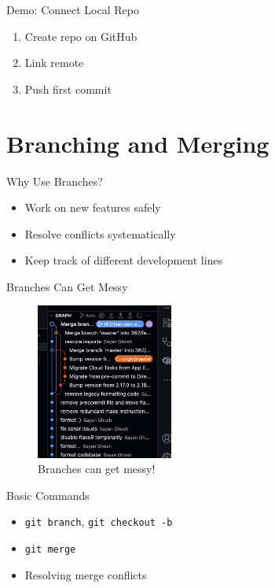 \documentclass[aspectratio=169]{beamer} %
\begin{document}
\begin{frame}{Demo: Connect Local Repo}
  \begin{enumerate}
    \item Create repo on GitHub
    \item Link remote
    \item Push first commit
  \end{enumerate}
\end{frame}

\section{Branching and Merging}

\begin{frame}{Why Use Branches?}
  \begin{itemize}
    \item Work on new features safely
    \item Resolve conflicts systematically
    \item Keep track of different development lines
  \end{itemize}
\end{frame}

\begin{frame}{Branches Can Get Messy}
\begin{figure}
  \centering
  \includegraphics[width=0.4\textwidth]{res/branches.png}
  \caption{Branches can get messy!}
\end{figure}
\end{frame}

\begin{frame}{Basic Commands}
  \begin{itemize}
    \item \texttt{git branch}, \texttt{git checkout -b}
    \item \texttt{git merge}
    \item Resolving merge conflicts
  \end{itemize}
\end{frame}
\end{document}

